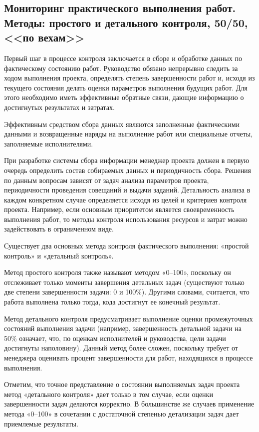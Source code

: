 \subsection{Мониторинг практического выполнения работ. Методы: простого и детального контроля, 50/50, <<по вехам>>}

Первый шаг в процессе контроля заключается в сборе и обработке данных по фактическому состоянию работ.
Руководство обязано непрерывно следить за ходом выполнения проекта, определять степень завершенности работ и, исходя из текущего состояния делать оценки параметров выполнения будущих работ.
Для этого необходимо иметь эффективные обратные связи, дающие информацию о достигнутых результатах и затратах.

Эффективным средством сбора данных являются заполненные фактическими данными и возвращенные наряды на выполнение работ или специальные отчеты, заполняемые исполнителями.

При разработке системы сбора информации менеджер проекта должен в первую очередь определить состав собираемых данных и периодичность сбора. 
Решения по данным вопросам зависят от задач анализа параметров проекта, периодичности проведения совещаний и выдачи заданий.
Детальность анализа в каждом конкретном случае определяется исходя из целей и критериев контроля проекта.
Например, если основным приоритетом является своевременность выполнения работ, то методы контроля использования ресурсов и затрат можно задействовать в ограниченном виде.

Существует два основных метода контроля фактического выполнения: «простой контроль» и «детальный контроль».

Метод простого контроля также называют методом «0--100», поскольку он отслеживает только моменты завершения детальных задач (существуют только две степени завершенности задачи: 0 и 100\%).
Другими словами, считается, что работа выполнена только тогда, кода достигнут ее конечный результат.

Метод детального контроля предусматривает выполнение оценки промежуточных состояний выполнения задачи (например, завершенность детальной задачи на 50\% означает, что, по оценкам исполнителей и руководства, цели задачи достигнуты наполовину).
Данный метод более сложен, поскольку требует от менеджера оценивать процент завершенности для работ, находящихся в процессе выполнения.

Отметим, что точное представление о состоянии выполняемых задач проекта метод «детального контроля» дает только в том случае, если оценки завершенности задач делаются корректно.
В большинстве же случаев применение метода «0--100» в сочетании с достаточной степенью детализации задач дает приемлемые результаты.

